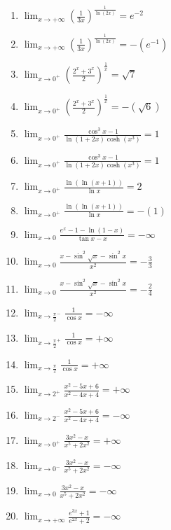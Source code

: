 \documentclass[11pt,a4paper]{article}
\begin{document}
\begin{enumerate}
\item $\displaystyle \lim_{x \to +\infty} \left(\frac{1}{3x}\right)^{\frac{1}{\ln(2x)}} = e^{-2}$
\item $\displaystyle \lim_{x \to +\infty} \left(\frac{1}{3x}\right)^{\frac{1}{\ln(2x)}} = -\left(e^{-1}\right)$
\item $\displaystyle \lim_{x \to 0^{+}} \left(\frac{2^{x} + 3^{x}}{2}\right)^{\frac{1}{x}} = \sqrt{7}$
\item $\displaystyle \lim_{x \to 0^{+}} \left(\frac{2^{x} + 3^{x}}{2}\right)^{\frac{1}{x}} = -\left(\sqrt{6}\right)$
\item $\displaystyle \lim_{x \to 0^{+}} \frac{\cos^{3} x - 1}{\ln(1 + 2x)\cosh(x^{3})} = 1$
\item $\displaystyle \lim_{x \to 0^{+}} \frac{\cos^{3} x - 1}{\ln(1 + 2x)\cosh(x^{3})} = 1$
\item $\displaystyle \lim_{x \to 0^{+}} \frac{\ln(\ln(x + 1))}{\ln x} = 2$
\item $\displaystyle \lim_{x \to 0^{+}} \frac{\ln(\ln(x + 1))}{\ln x} = -\left(1\right)$
\item $\displaystyle \lim_{x \to 0} \frac{e^{x} - 1 - \ln(1 - x)}{\tan x - x} = -\infty$
\item $\displaystyle \lim_{x \to 0} \frac{x - \sin^{2}\sqrt{x} - \sin^{2} x}{x^{2}} = -\frac{3}{3}$
\item $\displaystyle \lim_{x \to 0} \frac{x - \sin^{2}\sqrt{x} - \sin^{2} x}{x^{2}} = -\frac{2}{4}$
\item $\displaystyle \lim_{x \to \frac{\pi}{2}^{-}} \frac{1}{\cos x} = -\infty$
\item $\displaystyle \lim_{x \to \frac{\pi}{2}^{+}} \frac{1}{\cos x} = +\infty$
\item $\displaystyle \lim_{x \to \frac{\pi}{2}} \frac{1}{\cos x} = +\infty$
\item $\displaystyle \lim_{x \to 2^{+}} \frac{x^{2} - 5x + 6}{x^{2} - 4x + 4} = +\infty$
\item $\displaystyle \lim_{x \to 2^{-}} \frac{x^{2} - 5x + 6}{x^{2} - 4x + 4} = -\infty$
\item $\displaystyle \lim_{x \to 0^{+}} \frac{3x^{2} - x}{x^{5} + 2x^{2}} = +\infty$
\item $\displaystyle \lim_{x \to 0^{-}} \frac{3x^{2} - x}{x^{5} + 2x^{2}} = -\infty$
\item $\displaystyle \lim_{x \to 0} \frac{3x^{2} - x}{x^{5} + 2x^{2}} = -\infty$
\item $\displaystyle \lim_{x \to +\infty} \frac{e^{3x} + 1}{e^{2x} + 2} = -\infty$

\end{enumerate}
\end{document}
